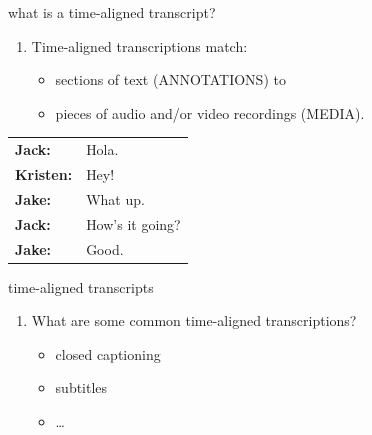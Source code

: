 \documentclass{beamer}
\begin{document}
    \begin{frame}{what is a time-aligned transcript?}
      \begin{enumerate}
      \item Time-aligned transcriptions match:
        \begin{itemize}
        \item sections of text (ANNOTATIONS) to
        \item pieces of audio and/or video recordings (MEDIA).
        \end{itemize} 
      \end{enumerate}
      \begin{figure}[htbp]
       \begin{center}
         \setlength\fboxsep{0pt}
         \setlength\fboxrule{0pt}
         \href{run:audio/waveform-audio.wav}{}
      \end{center}
      \end{figure}
     \begin{center}
      \begin{tabular}{|ll|}
      \hline
        \textbf{Jack:} &  Hola.\\
        \textbf{Kristen:} & Hey!\\
        \textbf{Jake:} & What up.\\
        \textbf{Jack:} & How's it going?\\
        \textbf{Jake:} & Good.\\
      \hline
      \end{tabular}
      \end{center}
    \end{frame}     
      
    \begin{frame}{time-aligned transcripts}
      \begin{enumerate}
      \item<1-> What are some common time-aligned transcriptions? 
        \begin{itemize}
          \item<2-> closed captioning
          \item<3-> subtitles
          \item<4-> \ldots
        \end{itemize} 
      \end{enumerate}
    \end{frame}
    
\end{document}
